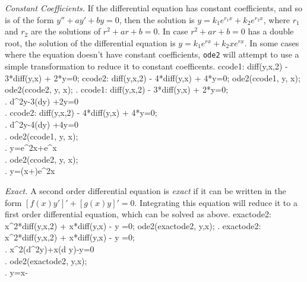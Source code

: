 \noindent
\textit{Constant Coefficients.}\quad
If the differential equation has constant coefficients, and so is of
the form $y'' + ay' + by=0$, then the solution is 
$y=k_1 e^{r_1x} + k_2 e^{r_2x}$, where $r_1$ and $r_2$ are the
solutions of $r^2 + ar + b=0$. In case $r^2 + ar + b=0$ has a double
root, the solution of the differential equation is $y=k_1e^{rx} + k_2
xe^{rx}$. In some cases where the equation doesn't have constant
coefficients, \texttt{ode2} will attempt to use a simple
transformation to reduce it to constant coefficents.
\beginmaximasession
ccode1: diff(y,x,2) - 3*diff(y,x) + 2*y=0;
ccode2: diff(y,x,2) - 4*diff(y,x) + 4*y=0;
ode2(ccode1, y, x);
ode2(ccode2, y, x);
\maximatexsession
{}.  ccode1: diff(y,x,2) - 3*diff(y,x) + 2*y=0; \\
.   {{d^{2}}}\*y-3\*\left({{d}}\*y\right)
 +2\*y=0 \\
.  ccode2: diff(y,x,2) - 4*diff(y,x) + 4*y=0; \\
.   {{d^{2}}}\*y-4\*\left({{d}}\*y\right)
 +4\*y=0 \\
.  ode2(ccode1, y, x); \\
.   y=\*e^{2\*x}+\*e^{x} \\
.  ode2(ccode2, y, x); \\
.   y=\left(\*x+\right)\*e^{2\*x} \\
\endmaximasession

\smallskip

\noindent
\textit{Exact.}\quad
A second order differential equation is \textit{exact} if it can be written in
the form $[f(x)y']' + [g(x)y]' = 0$.  Integrating this equation will
reduce it to a first order differential equation, which can be solved
as above.
\beginmaximasession
exactode2: x^2*diff(y,x,2) + x*diff(y,x) - y =0;
ode2(exactode2, y,x);
\maximatexsession
{}.  exactode2: x^2*diff(y,x,2) + x*diff(y,x) - y =0; \\
.   x^{2}\*\left({{d^{2}}}\*y\right)+x\*\left({{d
 }}\*y\right)-y=0 \\
.  ode2(exactode2, y,x); \\
.   y=\*x-{{}} \\
\endmaximasession

\smallskip


